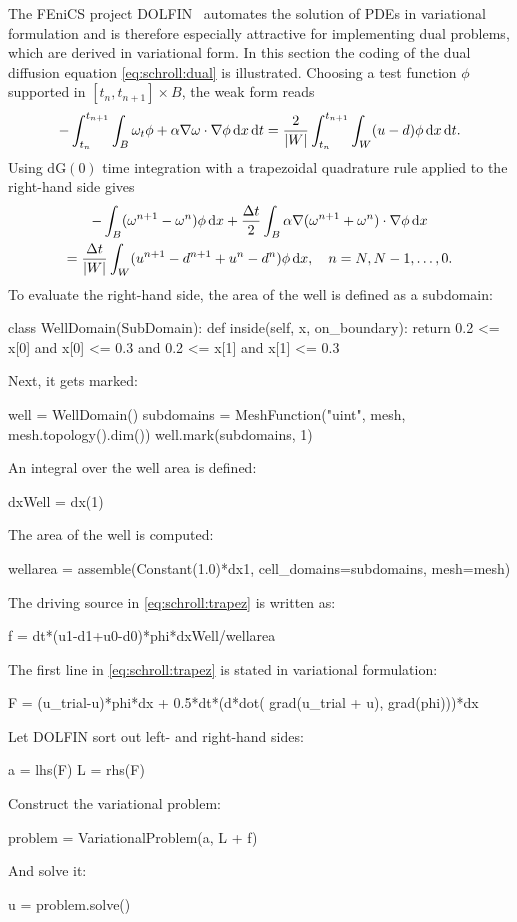 The FEniCS project DOLFIN~\citep{LoggWells2010} automates the solution
of PDEs in variational formulation and is therefore especially
attractive for implementing dual problems, which are derived in
variational form.  In this section the coding of the dual diffusion
equation
\eqref{eq:schroll:dual} is illustrated.
Choosing a test function $\phi$ supported in $[t_n, t_{n+1}] \times B$,
the weak form reads
\begin{equation}
 - \int_{t_n}^{t_{n+1}} \int_B \omega_t \phi + \alpha \nabla \omega \cdot \nabla \phi \, \mathrm{d}x \, \mathrm{d}t =
 \frac{2}{|W|} \int_{t_n}^{t_{n+1}} \int_W (u-d) \phi \, \mathrm{d}x \, \mathrm{d}t.
\end{equation}
Using $\mathrm{dG}(0)$ time integration with a trapezoidal quadrature rule applied to the right-hand side gives
\begin{multline} \label{eq:schroll:trapez}
 - \int_B (\omega^{n+1}-\omega^n) \phi \, \mathrm{d}x
     + \frac{\Delta t}{2} \int_B \alpha \nabla(\omega^{n+1}+\omega^n) \cdot \nabla \phi \, \mathrm{d}x
\\
 = \frac{\Delta t}{|W|} \int_W (u^{n+1} - d^{n+1} +u^n -d^n) \phi \, \mathrm{d}x,
 \quad n = N, N-1,\ldots, 0 .
\end{multline}
To evaluate the right-hand side, the area of the well is defined as a subdomain:
\begin{python}
class WellDomain(SubDomain):
    def inside(self, x, on_boundary):
        return 0.2 <= x[0] and x[0] <= 0.3 and 0.2 <= x[1] and x[1] <= 0.3
\end{python}
Next, it gets marked:
\begin{python}
well = WellDomain()
subdomains = MeshFunction("uint", mesh, mesh.topology().dim())
well.mark(subdomains, 1)
\end{python}
An integral over the well area is defined:
\begin{python}
dxWell = dx(1)
\end{python}
The area of the well is computed:
\begin{python}
wellarea = assemble(Constant(1.0)*dx1, cell_domains=subdomains, mesh=mesh)
\end{python}
The driving source in \eqref{eq:schroll:trapez} is written as:
\begin{python}
f = dt*(u1-d1+u0-d0)*phi*dxWell/wellarea
\end{python}
The first line in \eqref{eq:schroll:trapez} is stated in variational formulation:
\begin{python}
F = (u_trial-u)*phi*dx + 0.5*dt*(d*dot( grad(u_trial + u), grad(phi)))*dx
\end{python}
Let DOLFIN sort out left- and right-hand sides:
\begin{python}
a = lhs(F)
L = rhs(F)
\end{python}
Construct the variational problem:
\begin{python}
problem = VariationalProblem(a, L + f)
\end{python}
And solve it:
\begin{python}
u = problem.solve()
\end{python}

